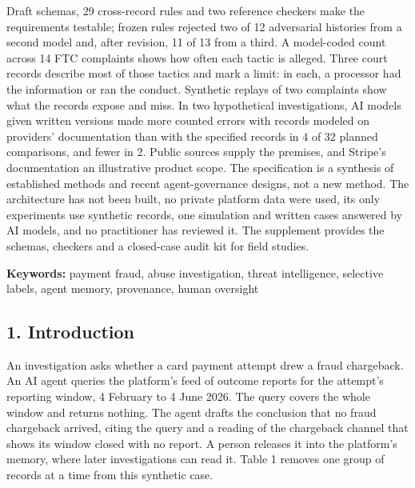 \documentclass[
  11pt,
]{article}
\begin{document}
Draft schemas, 29 cross-record rules and two reference checkers make the
requirements testable; frozen rules rejected two of 12 adversarial
histories from a second model and, after revision, 11 of 13 from a
third. A model-coded count across 14 FTC complaints shows how often each
tactic is alleged. Three court records describe most of those tactics
and mark a limit: in each, a processor had the information or ran the
conduct. Synthetic replays of two complaints show what the records
expose and miss. In two hypothetical investigations, AI models given
written versions made more counted errors with records modeled on
providers' documentation than with the specified records in 4 of 32
planned comparisons, and fewer in 2. Public sources supply the premises,
and Stripe's documentation an illustrative product scope. The
specification is a synthesis of established methods and recent
agent-governance designs, not a new method. The architecture has not
been built, no private platform data were used, its only experiments use
synthetic records, one simulation and written cases answered by AI
models, and no practitioner has reviewed it. The supplement provides the
schemas, checkers and a closed-case audit kit for field studies.

\textbf{Keywords:} payment fraud, abuse investigation, threat
intelligence, selective labels, agent memory, provenance, human
oversight

\FloatBarrier

\hypertarget{introduction}{%
\subsection{1. Introduction}\label{introduction}}

\suppressfloats[t]

An investigation asks whether a card payment attempt drew a fraud
chargeback. An AI agent queries the platform's feed of outcome reports
for the attempt's reporting window, 4 February to 4 June 2026. The query
covers the whole window and returns nothing. The agent drafts the
conclusion that no fraud chargeback arrived, citing the query and a
reading of the chargeback channel that shows its window closed with no
report. A person releases it into the platform's memory, where later
investigations can read it. Table 1 removes one group of records at a
time from this synthetic case.
\end{document}
